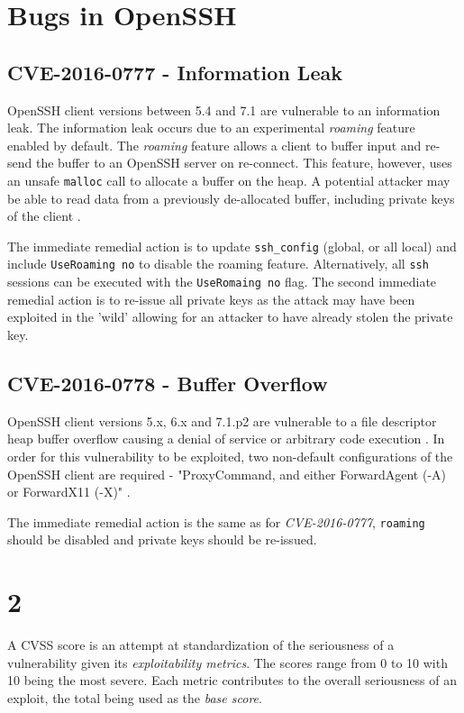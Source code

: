 \documentclass[a4paper, 12pt]{article}
\begin{document}
\section*{Bugs in OpenSSH}
\setcounter{section}{1}

\subsection{CVE-2016-0777 - Information Leak}
OpenSSH client versions between 5.4 and 7.1 are vulnerable to an information leak. The information leak occurs due to an experimental \textit{roaming} feature enabled by default. The \textit{roaming} feature allows a client to buffer input and re-send the buffer to an OpenSSH server on re-connect. This feature, however, uses an unsafe \texttt{malloc} call to allocate a buffer on the heap. A potential attacker may be able to read data from a previously de-allocated buffer, including private keys of the client \cite{QualisOpenSSH}.

The immediate remedial action is to update \texttt{ssh\_config} (global, or all local) and include \texttt{UseRoaming no} to disable the roaming feature. Alternatively, all \texttt{ssh} sessions can be executed with the \texttt{UseRomaing no} flag. The second immediate remedial action is to re-issue all private keys as the attack may have been exploited in the 'wild' allowing for an attacker to have already stolen the private key.

\subsection{CVE-2016-0778 - Buffer Overflow}
OpenSSH client versions 5.x, 6.x and 7.1.p2 \cite{NVD_CVE-201600778} are vulnerable to a file descriptor heap buffer overflow causing a denial of service or arbitrary code execution \cite{RedHat_CVE-201600778}. In order for this vulnerability to be exploited, two non-default configurations of the OpenSSH client are required - "ProxyCommand, and either ForwardAgent (-A) or ForwardX11 (-X)" \cite{QualisOpenSSH}.

The immediate remedial action is the same as for \textit{CVE-2016-0777}, \texttt{roaming} should be disabled and private keys should be re-issued.

\setcounter{section}{1}
\section*{2}
A CVSS score is an attempt at standardization of the seriousness of a vulnerability given its \textit{exploitability metrics}. The scores range from 0 to 10 with 10 being the most severe. Each metric contributes to the overall seriousness of an exploit, the total being used as the \textit{base score}.
\end{document}
